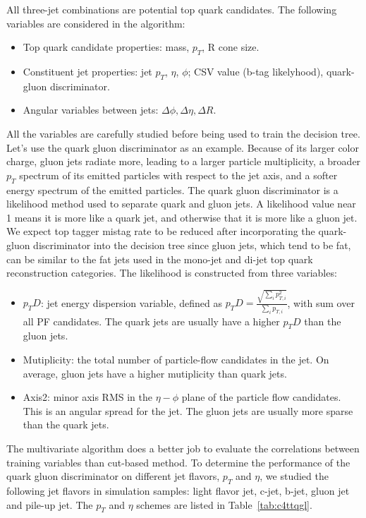 All three-jet combinations are potential top quark candidates. The following variables are considered in the algorithm: 
\begin{itemize}
\item Top quark candidate properties: mass, $p_{T}$, R cone size.
\item Constituent jet properties: jet $p_{T}$, $\eta$, $\phi$; CSV value (b-tag likelyhood), quark-gluon discriminator.
\item Angular variables between jets: $\Delta \phi, \Delta \eta, \Delta R$.
\end{itemize}

All the variables are carefully studied before being used to train the decision tree. Let’s use the quark gluon discriminator as an example. Because of its larger color charge, gluon jets radiate more, leading to a larger particle multiplicity, a broader $p_{T}$ spectrum of its emitted particles with respect to the jet axis, and a softer energy spectrum of the emitted particles. The quark gluon discriminator is a likelihood method used to separate quark and gluon jets. A likelihood value near 1 means it is more like a quark jet, and otherwise that it is more like a gluon jet. We expect top tagger mistag rate to be reduced after incorporating the quark-gluon discriminator into the decision tree since gluon jets, which tend to be fat, can be similar to the fat jets used in the mono-jet and di-jet top quark reconstruction categories. The likelihood is constructed from three variables: 
\begin{itemize}
\item $p_{T}D$: jet energy dispersion variable, defined as $p_{T}D=\frac{\sqrt{\sum_{i}p_{T,i}^{2}}}{\sum_{i}p_{T,i}}$, with sum over all PF candidates. The quark jets are usually have a higher $p_{T}D$ than the gluon jets.
\item Mutiplicity: the total number of particle-flow candidates in the jet. On average, gluon jets have a higher mutiplicity than quark jets.
\item Axis2: minor axis RMS in the $\eta - \phi$ plane of the particle flow candidates. This is an angular spread for the jet. The gluon jets are usually more sparse than the quark jets.
\end{itemize}

The multivariate algorithm does a better job to evaluate the correlations between training variables than cut-based method. To determine the performance of the quark gluon discriminator on different jet flavors, $p_{T}$ and $\eta$, we studied the following jet flavors in \ttbar simulation samples: light flavor jet, c-jet, b-jet, gluon jet and pile-up jet. The $p_{T}$ and $\eta$ schemes are listed in Table~\ref{tab:c4ttqgl}.

